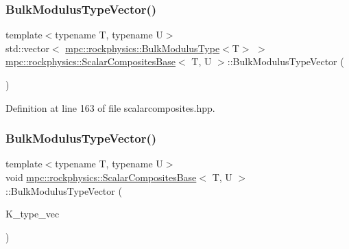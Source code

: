 \subsubsection{\texorpdfstring{Bulk\+Modulus\+Type\+Vector()}{BulkModulusTypeVector()}\hspace{0.1cm}{\footnotesize\ttfamily [1/3]}}
{\footnotesize\ttfamily template$<$typename T, typename U$>$ \\
std\+::vector$<$ \mbox{\hyperlink{structmpc_1_1rockphysics_1_1_bulk_modulus_type}{mpc\+::rockphysics\+::\+Bulk\+Modulus\+Type}}$<$T$>$ $>$ \mbox{\hyperlink{classmpc_1_1rockphysics_1_1_scalar_composites_base}{mpc\+::rockphysics\+::\+Scalar\+Composites\+Base}}$<$ T, U $>$\+::Bulk\+Modulus\+Type\+Vector (\begin{DoxyParamCaption}{ }\end{DoxyParamCaption})\hspace{0.3cm}{\ttfamily [inline]}}



Definition at line 163 of file scalarcomposites.\+hpp.

\mbox{\label{classmpc_1_1rockphysics_1_1_scalar_composites_base_a0f10f7c62c35d9e86247d768305a34c0}} 
\subsubsection{\texorpdfstring{Bulk\+Modulus\+Type\+Vector()}{BulkModulusTypeVector()}\hspace{0.1cm}{\footnotesize\ttfamily [2/3]}}
{\footnotesize\ttfamily template$<$typename T, typename U$>$ \\
void \mbox{\hyperlink{classmpc_1_1rockphysics_1_1_scalar_composites_base}{mpc\+::rockphysics\+::\+Scalar\+Composites\+Base}}$<$ T, U $>$\+::Bulk\+Modulus\+Type\+Vector (\begin{DoxyParamCaption}\item[{std\+::vector$<$ \mbox{\hyperlink{structmpc_1_1rockphysics_1_1_bulk_modulus_type}{mpc\+::rockphysics\+::\+Bulk\+Modulus\+Type}}$<$ T $>$ $>$}]{K\+\_\+type\+\_\+vec }\end{DoxyParamCaption})\hspace{0.3cm}{\ttfamily [inline]}}



